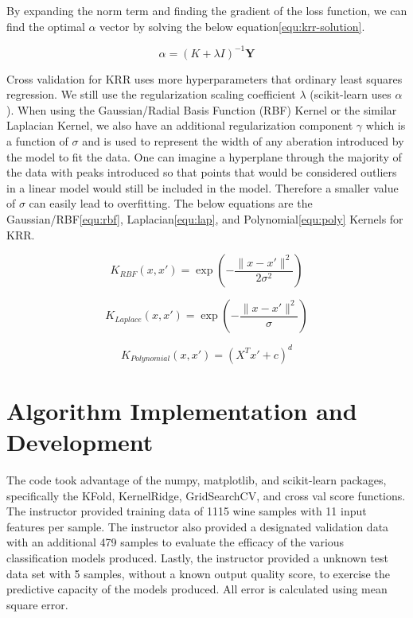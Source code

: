 \documentclass[11pt]{amsart}
\begin{document}
By expanding the norm term and finding the gradient of the loss function, we can find the optimal $\alpha$ vector by solving the below equation\eqref{equ:krr-solution}.

\begin{equation}
    \alpha = (K + \lambda I)^{-1}\mathbf{Y}
    \label{equ:krr-solution}
\end{equation}

Cross validation for KRR uses more hyperparameters that ordinary least squares regression. We still use the regularization scaling coefficient 
$\lambda$ (scikit-learn uses $\alpha$). When using the Gaussian/Radial Basis Function (RBF) Kernel or the similar Laplacian Kernel, we also have an additional 
regularization component $\gamma$ which is a function of $\sigma$ and is used to represent the width of any aberation introduced by the model to 
fit the data. One can imagine a hyperplane through the majority of the data with peaks introduced so that points that would be considered outliers in 
a linear model would still be included in the model. Therefore a smaller value of $\sigma$ can easily lead to overfitting. The below equations are the 
Gaussian/RBF\eqref{equ:rbf}, Laplacian\eqref{equ:lap}, and Polynomial\eqref{equ:poly} Kernels for KRR.

\begin{equation}
    K_{RBF} (x,x') = \exp\left(-\frac{\|x - x'\|^2}{2\sigma^2}\right)
    \label{equ:rbf}
\end{equation}

\begin{equation}
    K_{Laplace} (x,x') = \exp\left(-\frac{\|x - x'\|^2}{\sigma}\right)
    \label{equ:lap}
\end{equation}

\begin{equation}
    K_{Polynomial} (x,x') = (X^T x' + c)^d
    \label{equ:poly}
\end{equation}

\section{Algorithm Implementation and Development}\label{sec:Algorithms}

The code took advantage of the numpy, matplotlib, and scikit-learn packages, specifically the KFold, KernelRidge, 
GridSearchCV, and cross val score functions. The instructor provided training data of 1115 wine samples with 11 
input features per sample. The instructor also provided a designated validation data with an additional 479 samples 
to evaluate the efficacy of the various classification models produced. Lastly, the instructor provided a unknown test 
data set with 5 samples, without a known output quality score, to exercise the predictive capacity of the models produced.
All error is calculated using mean square error.\\ 
\end{document}
